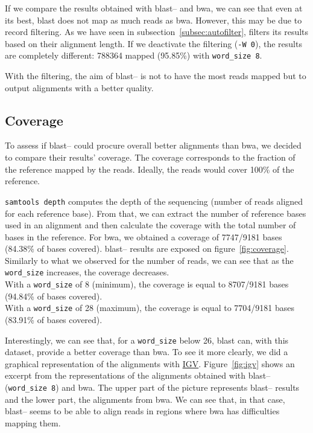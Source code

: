 If we compare the results obtained with \gls{blast}--\blastobam{} and \gls{bwa}, we can see that even at its best, \gls{blast} does not map as much reads as \gls{bwa}.
However, this may be due to \blastobam{} record filtering. As we have seen in subsection~\ref{subsec:autofilter}, \blastobam{} filters its results based on their alignment length.
If we deactivate the filtering (\texttt{-W 0}), the results are completely different: 788364 mapped (95.85\%) with \texttt{word\_size~8}.

With the filtering, the aim of \gls{blast}--\blastobam{} is not to have the most reads mapped but to output alignments with a better quality.
\pagebreak

\subsection{Coverage}
To assess if \gls{blast}--\blastobam{} could procure overall better alignments than \gls{bwa}, we decided to compare their results' coverage.
The coverage corresponds to the fraction of the reference mapped by the reads.
Ideally, the reads would cover 100\% of the reference.

\texttt{samtools depth} computes the depth of the sequencing (number of reads aligned for each reference base).
From that, we can extract the number of reference bases used in an alignment and then calculate the coverage with the total number of bases in the reference.
For \gls{bwa}, we obtained a coverage of 7747\slash\hspace{0pt}9181 bases (84.38\% of bases covered).
\gls{blast}--\blastobam{} results are exposed on figure~\ref{fig:coverage}.
Similarly to what we observed for the number of reads, we can see that as the \texttt{word\_size} increases, the coverage decreases.\\
With a \texttt{word\_size} of 8 (minimum), the coverage is equal to 8707\slash\hspace{0pt}9181 bases (94.84\% of bases covered).\\
With a \texttt{word\_size} of 28 (maximum), the coverage is equal to 7704\slash\hspace{0pt}9181 bases (83.91\% of bases covered).

Interestingly, we can see that, for a \texttt{word\_size} below 26, \gls{blast} can, with this dataset, provide a better coverage than \gls{bwa}.
To see it more clearly, we did a graphical representation of the alignments with \href{https://www.broadinstitute.org/igv/}{IGV}.
Figure~\ref{fig:igv} shows an excerpt from the representations of the alignments obtained with \gls{blast}--\blastobam{} (\texttt{word\_size~8}) and \gls{bwa}.
The upper part of the picture represents \gls{blast}--\blastobam{} results and the lower part, the alignments from \gls{bwa}.
We can see that, in that case, \gls{blast}--\blastobam{} seems to be able to align reads in regions where \gls{bwa} has difficulties mapping them.

